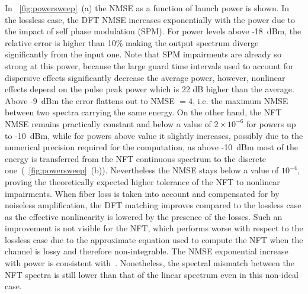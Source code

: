 In \figurename~\ref{fig:powersweep}~(a) the NMSE as a function of launch power
is shown. In the lossless case, the DFT NMSE increases exponentially with the
power due to the impact of self phase modulation (SPM). For power levels above
-18~dBm, the relative error is higher than 10\% making the output spectrum
diverge significantly from the input one. Note that SPM impairments are already
so strong at this power, because the large guard time intervals used to account
for dispersive effects significantly decrease the average power, however,
nonlinear effects depend on the pulse peak power which is 22 dB higher than the
average. Above -9~dBm the error flattens out to NMSE $ = 4$, i.e. the maximum
NMSE between two spectra carrying the same energy. On the other hand, the
\ac{NFT} NMSE remains practically constant and below a value of $2\times10^{-6}$
for powers up to -10~dBm,
while for powers above
value it slightly increases, possibly due to the numerical precision required
for the computation, as above -10~dBm most of the energy is transferred from the
\ac{NFT} continuous spectrum to the discrete
one~(\figurename~\ref{fig:powersweep}~(b)). Nevertheless the NMSE stays below a
value of $10^{-4}$, proving the theoretically expected higher tolerance of the
\ac{NFT} to nonlinear impairments. When fiber loss is taken into account and
compensated for by noiseless amplification, the DFT matching improves compared
to the lossless case as the effective nonlinearity is lowered by the presence of
the losses. Such an improvement is not visible for the \ac{NFT}, which performs
worse with respect to the lossless case due to the approximate equation used to
compute the \ac{NFT} when the channel is lossy and therefore non-integrable. The
NMSE exponential increase with power is consistent with~\cite{le2015nonlinear}.
Nonetheless, the spectral mismatch between the \ac{NFT} spectra is still lower
than that of the linear spectrum even in this non-ideal case.

